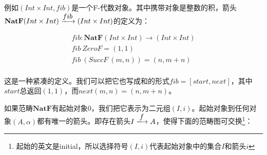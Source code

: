 \documentclass[b5paper]{ctexart}
\begin{document}




例如$(Int \times Int, fib)$是一个F-代数对象。其中携带对象是整数的积，箭头$\mathbf{NatF} (Int \times Int) \arrowto{fib} (Int \times Int)$的定义为：

\[
\begin{array}{l}
fib : \mathbf{NatF} (Int \times Int) \to (Int \times Int) \\
fib\ ZeroF = (1, 1) \\
fib\ (SuccF\ (m, n)) = (n, m + n) \\
\end{array}
\]

这是一种紧凑的定义。我们可以把它也写成和的形式$fib = [start, next]$，其中$start$总返回$(1, 1)$，而$next(m, n) = (n, m + n)$。

如果范畴$\pmb{NatF}$有起始对象0，我们把它表示为二元组$(I, i)$。起始对象到任何对象$(A, \alpha)$都有唯一的箭头。即存在箭头$I \arrowto{f} A$，使得下面的范畴图可交换\footnote{起始的英文是initial，所以选择符号$(I, i)$代表起始对象中的集合$I$和箭头$i$}：

\begin{center}
\end{center}
\end{document}
